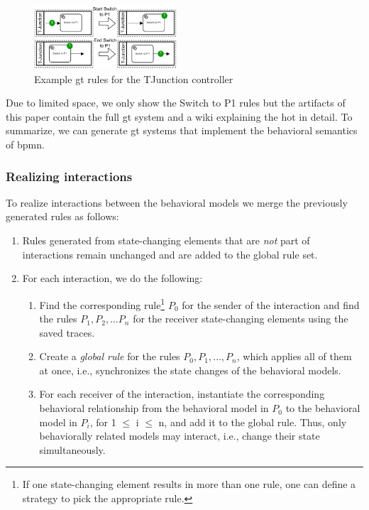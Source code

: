 \documentclass{jot}
\begin{document}
\begin{figure}[h]
    \centering
    \includegraphics[width=0.475\textwidth]{figures/bpmn_rules.pdf}
    \caption{Example \gls*{gt} rules for the TJunction controller}
    \label{fig:bpmn_example_rules}
\end{figure}

Due to limited space, we only show the \textsf{Switch to P1} rules but the artifacts of this paper \cite{krauterArtifactsBehavioralConsistency2023} contain the full \gls*{gt} system and a wiki explaining the \gls*{hot} in detail.
To summarize, we can generate \gls*{gt} systems that implement the behavioral semantics of \gls*{bpmn}.


\subsubsection{Realizing interactions}
To realize interactions between the behavioral models we merge the previously generated rules as follows:

\begin{enumerate}
    \item Rules generated from state-changing elements that are \textit{not} part of interactions remain unchanged and are added to the global rule set.
    \item For each interaction, we do the following:
     \begin{enumerate}
         \item Find the corresponding rule\footnote{If one state-changing element results in more than one rule, one can define a strategy to pick the appropriate rule.} $P_0$ for the sender of the interaction and find the rules $P_1, P_2, \ldots P_n$ for the receiver state-changing elements using the saved traces.
         \item Create a \textit{global rule} for the rules $P_0, P_1, \ldots, P_n$, which applies all of them at once, i.e., synchronizes the state changes of the behavioral models.
         \item For each receiver of the interaction, instantiate the corresponding behavioral relationship from the behavioral model in $P_0$ to the behavioral model in $P_i$, for 1 $\leq$ i $\leq$ n, and add it to the global rule.
         Thus, only behaviorally related models may interact, i.e., change their state simultaneously.
     \end{enumerate}
\end{enumerate}
\end{document}
